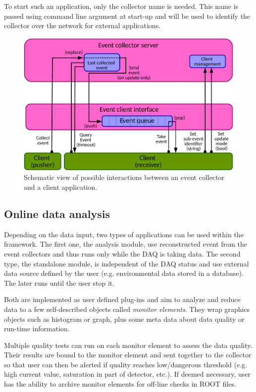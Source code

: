 \documentclass[conference]{IEEEtran}
\begin{document}
To start such an application, only the collector name is needed. This name is passed using command line argument at start-up and will be used to identify the collector over the network for external applications.

\begin{figure}[htbp]
  \begin{center}
    \includegraphics[width=0.95\linewidth]{figs/EventCollectorDiagram.pdf}
    \caption{\label{fig:DQMDataAccess} Schematic view of possible interactions between an event collector and a client application.}
  \end{center}
\end{figure}

\subsection{Online data analysis}
Depending on the data input, two types of applications can be used within the framework. The first one, the analysis module, use reconstructed event from the event collectors and thus runs only while the DAQ is taking data. The second type, the standalone module, is independent of the DAQ status and use external data source defined by the user (e.g. environmental data stored in a database). The later runs until the user stop it.

Both are implemented as user defined plug-ins and aim to analyze and reduce data to a few self-described objects called \emph{monitor elements}. They wrap graphics objects such as histogram or graph, plus some meta data about data quality or run-time information.

Multiple quality tests can run on each monitor element to assess the data quality. Their results are bound to the monitor element and sent together to the collector so that user can then be alerted if quality reaches low/dangerous threshold (e.g. high current value, saturation in part of detector, etc.). If deemed necessary, user has the ability to archive monitor elements for off-line checks in ROOT files.
\end{document}
